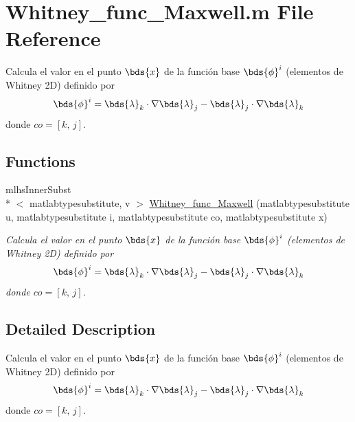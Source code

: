 \hypertarget{a00033}{\section{Whitney\-\_\-func\-\_\-\-Maxwell.\-m File Reference}
\label{a00033}
}


Calcula el valor en el punto $ \bds{x}$ de la función base $\bds{\phi}^i$ (elementos de Whitney 2\-D) definido por \[ \bds{\phi}^i = \bds{\lambda}_k \cdot \nabla \bds{\lambda}_j - \bds{\lambda}_j \cdot \nabla \bds{\lambda}_k \] donde $ co=[k,\, j] $.  


\subsection*{Functions}
\begin{DoxyCompactItemize}
\item 
mlhs\-Inner\-Subst\\*
$<$ matlabtypesubstitute, v $>$ \hyperlink{a00033_a51fdb01dfa49822ae395d6a977e76a5e}{Whitney\-\_\-func\-\_\-\-Maxwell} (matlabtypesubstitute u, matlabtypesubstitute i, matlabtypesubstitute co, matlabtypesubstitute x)
\begin{DoxyCompactList}\small\item\em Calcula el valor en el punto $ \bds{x}$ de la función base $\bds{\phi}^i$ (elementos de Whitney 2\-D) definido por \[ \bds{\phi}^i = \bds{\lambda}_k \cdot \nabla \bds{\lambda}_j - \bds{\lambda}_j \cdot \nabla \bds{\lambda}_k \] donde $ co=[k,\, j] $. \end{DoxyCompactList}\end{DoxyCompactItemize}


\subsection{Detailed Description}
Calcula el valor en el punto $ \bds{x}$ de la función base $\bds{\phi}^i$ (elementos de Whitney 2\-D) definido por \[ \bds{\phi}^i = \bds{\lambda}_k \cdot \nabla \bds{\lambda}_j - \bds{\lambda}_j \cdot \nabla \bds{\lambda}_k \] donde $ co=[k,\, j] $. 

